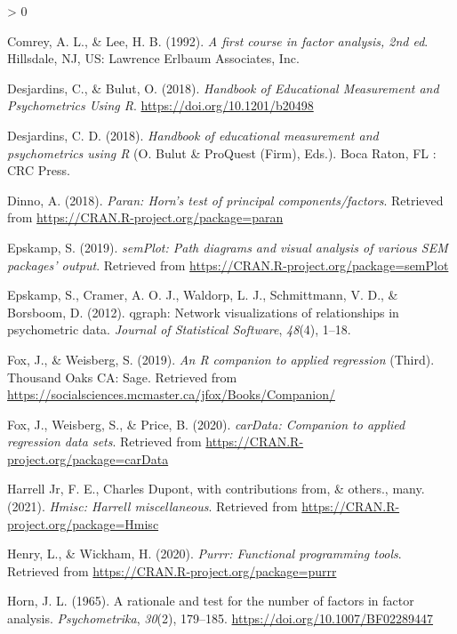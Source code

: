 \documentclass[
  english,
  man]{apa6}
\newlength{\cslhangindent}
\newenvironment{CSLReferences}[2] %
 {%
  \setlength{\parindent}{0pt}
  \ifodd #1 \everypar{\setlength{\hangindent}{\cslhangindent}}\ignorespaces\fi
  \ifnum #2 > 0
  \setlength{\parskip}{#2\baselineskip}
  \fi
 }%
 {}
\begin{document}
\begin{CSLReferences}{1}{0}
\leavevmode\hypertarget{ref-comreyFirstCourseFactor1992}{}%
Comrey, A. L., \& Lee, H. B. (1992). \emph{A first course in factor analysis, 2nd ed}. {Hillsdale, NJ, US}: {Lawrence Erlbaum Associates, Inc}.

\leavevmode\hypertarget{ref-desjardinsHandbookEducationalMeasurement2018}{}%
Desjardins, C., \& Bulut, O. (2018). \emph{Handbook of {Educational Measurement} and {Psychometrics Using R}}. \url{https://doi.org/10.1201/b20498}

\leavevmode\hypertarget{ref-desjardinsHandbookEducationalMeasurement2018a}{}%
Desjardins, C. D. (2018). \emph{Handbook of educational measurement and psychometrics using {R}} (O. Bulut \& ProQuest (Firm), Eds.). {Boca Raton, FL : CRC Press}.

\leavevmode\hypertarget{ref-R-paran}{}%
Dinno, A. (2018). \emph{Paran: Horn's test of principal components/factors}. Retrieved from \url{https://CRAN.R-project.org/package=paran}

\leavevmode\hypertarget{ref-R-semPlot}{}%
Epskamp, S. (2019). \emph{semPlot: Path diagrams and visual analysis of various SEM packages' output}. Retrieved from \url{https://CRAN.R-project.org/package=semPlot}

\leavevmode\hypertarget{ref-R-qgraph}{}%
Epskamp, S., Cramer, A. O. J., Waldorp, L. J., Schmittmann, V. D., \& Borsboom, D. (2012). {qgraph}: Network visualizations of relationships in psychometric data. \emph{Journal of Statistical Software}, \emph{48}(4), 1--18.

\leavevmode\hypertarget{ref-R-car}{}%
Fox, J., \& Weisberg, S. (2019). \emph{An {R} companion to applied regression} (Third). Thousand Oaks {CA}: Sage. Retrieved from \url{https://socialsciences.mcmaster.ca/jfox/Books/Companion/}

\leavevmode\hypertarget{ref-R-carData}{}%
Fox, J., Weisberg, S., \& Price, B. (2020). \emph{carData: Companion to applied regression data sets}. Retrieved from \url{https://CRAN.R-project.org/package=carData}

\leavevmode\hypertarget{ref-R-Hmisc}{}%
Harrell Jr, F. E., Charles Dupont, with contributions from, \& others., many. (2021). \emph{Hmisc: Harrell miscellaneous}. Retrieved from \url{https://CRAN.R-project.org/package=Hmisc}

\leavevmode\hypertarget{ref-R-purrr}{}%
Henry, L., \& Wickham, H. (2020). \emph{Purrr: Functional programming tools}. Retrieved from \url{https://CRAN.R-project.org/package=purrr}

\leavevmode\hypertarget{ref-hornRationaleTestNumber1965}{}%
Horn, J. L. (1965). A rationale and test for the number of factors in factor analysis. \emph{Psychometrika}, \emph{30}(2), 179--185. \url{https://doi.org/10.1007/BF02289447}


\end{CSLReferences}
\end{document}
